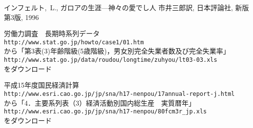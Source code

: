 \documentclass[12pt,twoside]{jarticle}
\begin{document}



\begin{thebibliography}{ABC}

インフェルト,~L.,
ガロアの生涯—神々の愛でし人
市井三郎訳, 
日本評論社, 新版第3版, 1996








労働力調査　長期時系列データ \\
{\tt http://www.stat.go.jp/howto/case1/01.htm} \\
から「第3表(3)年齢階級(5歳階級)，男女別完全失業者数及び完全失業率」 \\
{\tt http://www.stat.go.jp/data/roudou/longtime/zuhyou/lt03-03.xls} \\
をダウンロード

平成15年度国民経済計算 \\
{\tt http://www.esri.cao.go.jp/jp/sna/h17-nenpou/17annual-report-j.html} \\
から「4．主要系列表（3）経済活動別国内総生産　実質暦年」\\
{\tt http://www.esri.cao.go.jp/jp/sna/h17-nenpou/80fcm3r\verb,_,jp.xls} \\
をダウンロード

\end{thebibliography}

\end{document}
